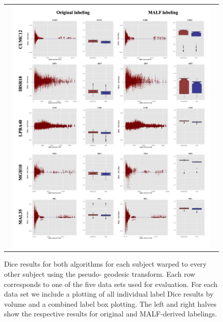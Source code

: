 \documentclass{frontiersSCNS}
\begin{document}
\begin{figure}[htb]
  \centering
  \begin{tabular}{c}
  \includegraphics[width=0.95\textwidth]{evaluation.jpg}
  \end{tabular}
  \caption{Dice results for both algorithms for 
  each subject warped to every other subject using the pseudo-
  geodesic transform.  Each 
  row corresponds to one of the five data sets used for evaluation.
  For each data set we include a plotting of all individual label 
  Dice results by volume and a combined label box plotting.  The
  left and right halves show the respective results for 
  original and MALF-derived labelings.
  }
  \label{fig:dice}
\end{figure}  
\end{document}
